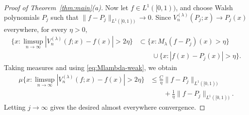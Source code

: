 \documentclass[11pt]{amsart}
\numberwithin{equation}{section}
\theoremstyle{plain}
\begin{document}
\begin{proof}[Proof of Theorem~\protect\ref{thm:main}(a)]
Now let $f\in L^{1}([0,1))$, and choose Walsh polynomials $P_j$ such that $%
\|f-P_j\|_{L^{1}([0,1))}\to0$. Since $V_n^{(\lambda)}(P_j;x)\to P_j(x)$
everywhere, for every $\eta>0$, 
\begin{equation*}
\begin{aligned} \bigl\{x: \limsup_{n\to\infty}
|V_n^{(\lambda)}(f;x)-f(x)|>2\eta\bigr\} &\subset \{x:
M_{\lambda}(f-P_j)(x)>\eta\} \\ &\qquad \cup \{x: |f(x)-P_j(x)|>\eta\}.
\end{aligned}
\end{equation*}
Taking measures and using \eqref{eq:Mlambda-weak}, we obtain 
\begin{equation*}
\begin{aligned} \mu\bigl\{x: \limsup_{n\to\infty}
|V_n^{(\lambda)}(f;x)-f(x)|>2\eta\bigr\} &\le
\frac{C}{\eta}\|f-P_j\|_{L^{1}([0,1))} \\ &\qquad +
\frac{1}{\eta}\|f-P_j\|_{L^{1}([0,1))}. \end{aligned}
\end{equation*}
Letting $j\to\infty$ gives the desired almost everywhere convergence.
\end{proof}
\end{document}
